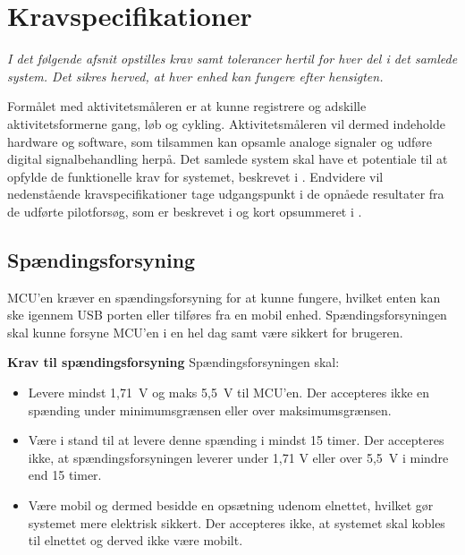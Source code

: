 	\section{Kravspecifikationer}\label{Sec:krav}
\textit{I det følgende afsnit opstilles krav samt tolerancer hertil for hver del i det samlede system. Det sikres herved, at hver enhed kan fungere efter hensigten.}

Formålet med aktivitetsmåleren er at kunne registrere og adskille aktivitetsformerne gang, løb og cykling. Aktivitetsmåleren vil dermed indeholde hardware og software, som tilsammen kan opsamle analoge signaler og udføre digital signalbehandling herpå. Det samlede system skal have et potentiale til at opfylde de funktionelle krav for systemet, beskrevet i . Endvidere vil nedenstående kravspecifikationer tage udgangspunkt i de opnåede resultater fra de udførte pilotforsøg, som er beskrevet i  og kort opsummeret i .
%

\subsection{Spændingsforsyning} \label{krav_spaendingsf}
MCU'en kræver en spændingsforsyning for at kunne fungere, hvilket enten kan ske igennem USB porten eller tilføres fra en mobil enhed. Spændingsforsyningen skal kunne forsyne MCU'en i en hel dag samt være sikkert for brugeren. %

\textbf{Krav til spændingsforsyning} \newline 
Spændingsforsyningen skal:
\begin{itemize}
	\item Levere mindst 1,71~V og maks 5,5~V til MCU'en. Der accepteres ikke en spænding under minimumsgrænsen eller over maksimumsgrænsen. %
	\item Være i stand til at levere denne spænding i mindst 15 timer. Der accepteres ikke, at spændingsforsyningen leverer under 1,71 V eller over 5,5~V i mindre end 15 timer.
	\item Være mobil og dermed besidde en opsætning udenom elnettet, hvilket gør systemet mere elektrisk sikkert. Der accepteres ikke, at systemet skal kobles til elnettet og derved ikke være mobilt.
\end{itemize}

